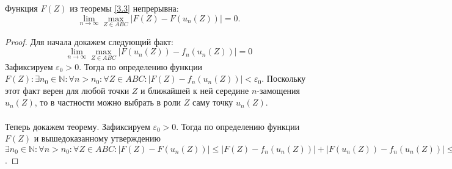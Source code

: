 \begin{suggestion} \label{3.4a}
Функция $F(Z)$ из теоремы \ref{3.3} непрерывна:
\begin{equation}
\displaystyle \lim_{n\to\infty}\max_{Z\in{}ABC}{{|F(Z) - F(u_n(Z))|}} = 0.
\end{equation}
\end{suggestion}



\begin{proof}
Для начала докажем следующий факт: $$\displaystyle \lim_{n\to\infty}\max_{Z\in{}ABC}{{|F(u_n(Z)) - f_n(u_n(Z))|}} = 0$$
Зафиксируем $\varepsilon_0 > 0$. Тогда по определению функции $F(Z) : \exists n_0 \in \mathbb{N}: \forall n > n_0 : \forall Z \in ABC: |F(Z) - f_n(u_n(Z))| < \varepsilon_0$. Поскольку этот факт верен для любой точки $Z$ и ближайшей к ней середине $n$-замощения $u_n(Z)$, то в частности можно выбрать в роли $Z$ саму точку $u_n(Z)$.
\\ \\
Теперь докажем теорему.
Зафиксируем $\varepsilon_0 > 0$. Тогда по определению функции $F(Z)$ и вышедоказанному утверждению $\exists n_0 \in \mathbb{N}: \forall n > n_0 : \forall Z \in ABC: |F(Z) - F(u_n(Z))| \leq |F(Z) - f_n(u_n(Z))| + |F(u_n(Z)) - f_n(u_n(Z))| \leq \frac{\varepsilon_0}{2} + \frac{\varepsilon_0}{2} = \varepsilon_0$.
\end{proof}